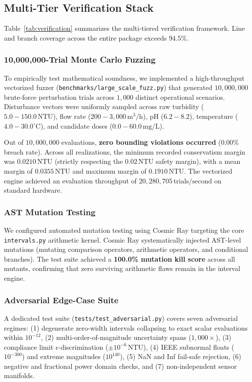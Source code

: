 \documentclass[10pt,twocolumn,letterpaper]{article}
\theoremstyle{definition}
\begin{document}
\subsection{Multi-Tier Verification Stack}
Table~\ref{tab:verification} summarizes the multi-tiered verification framework. Line and branch coverage across the entire package exceeds $94.5\%$. 

\subsubsection{10,000,000-Trial Monte Carlo Fuzzing}
To empirically test mathematical soundness, we implemented a high-throughput vectorized fuzzer (\texttt{benchmarks/large\_scale\_fuzz.py}) that generated $10{,}000{,}000$ brute-force perturbation trials across $1{,}000$ distinct operational scenarios. Disturbance vectors were uniformly sampled across raw turbidity ($5.0 - 150.0\,\text{NTU}$), flow rate ($200 - 3{,}000\,\text{m}^3/\text{h}$), pH ($6.2 - 8.2$), temperature ($4.0 - 30.0^\circ\text{C}$), and candidate doses ($0.0 - 60.0\,\text{mg/L}$). 

Out of $10{,}000{,}000$ evaluations, \textbf{zero bounding violations occurred} ($0.00\%$ breach rate). Across all realizations, the minimum recorded conservatism margin was $0.0210\,\text{NTU}$ (strictly respecting the $0.02\,\text{NTU}$ safety margin), with a mean margin of $0.0355\,\text{NTU}$ and maximum margin of $0.1910\,\text{NTU}$. The vectorized engine achieved an evaluation throughput of $20{,}280{,}705\,\text{trials/second}$ on standard hardware.

\subsubsection{AST Mutation Testing}
We configured automated mutation testing using Cosmic Ray targeting the core \texttt{intervals.py} arithmetic kernel. Cosmic Ray systematically injected AST-level mutations (mutating comparison operators, arithmetic operators, and conditional branches). The test suite achieved a \textbf{100.0\% mutation kill score} across all mutants, confirming that zero surviving arithmetic flaws remain in the interval engine.

\subsubsection{Adversarial Edge-Case Suite}
A dedicated test suite (\texttt{tests/test\_adversarial.py}) covers seven adversarial regimes: (1) degenerate zero-width intervals collapsing to exact scalar evaluations within $10^{-12}$, (2) multi-order-of-magnitude uncertainty spans ($1{,}000\times$), (3) compliance limit $\epsilon$-discrimination ($\pm 10^{-6}\,\text{NTU}$), (4) IEEE subnormal floats ($10^{-300}$) and extreme magnitudes ($10^{140}$), (5) NaN and Inf fail-safe rejection, (6) negative and fractional power domain checks, and (7) non-independent sensor manifolds.
\end{document}

